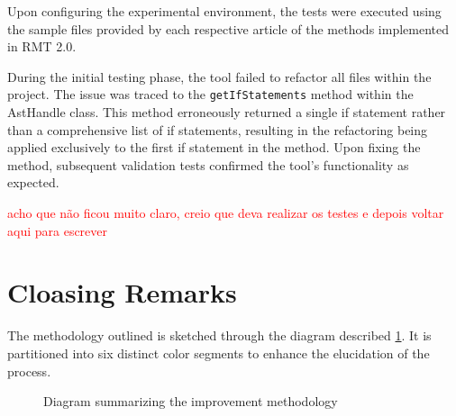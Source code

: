 Upon configuring the experimental environment, the tests were executed using the sample files provided by each respective article of the methods implemented in RMT 2.0. 

During the initial testing phase, the tool failed to refactor all files within the project. The issue was traced to the \texttt{getIfStatements} method within the AstHandle class. This method erroneously returned a single if statement rather than a comprehensive list of if statements, resulting in the refactoring being applied exclusively to the first if statement in the \cite{liu2014automated} method. Upon fixing the method, subsequent validation tests confirmed the tool's functionality as expected.

\textcolor{red}{acho que não ficou muito claro, creio que deva realizar os testes e depois voltar aqui para escrever}

\section{Cloasing Remarks}


The methodology outlined is sketched through the diagram described \cref{fig-summarized-methodology}. It is partitioned into six distinct color segments to enhance the elucidation of the process.

\begin{figure}[ht!]
\SetCaptionWidth{\textwidth}
\caption{Diagram summarizing the improvement methodology}
\label{fig-summarized-methodology}
\fontsize{3.8}{5}\selectfont

\end{figure}
\FloatBarrier

